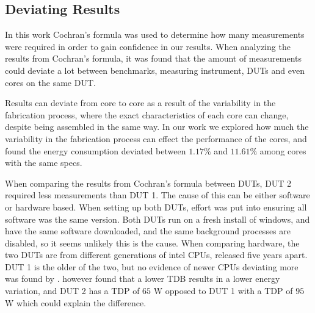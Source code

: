 \subsection{Deviating Results}

In this work Cochran's formula was used to determine how many measurements were required in order to gain confidence in our results. When analyzing the results from Cochran's formula, it was found that the amount of measurements could deviate a lot between benchmarks, measuring instrument, DUTs and even cores on the same DUT.

Results can deviate from core to core as a result of the variability in the fabrication process, where the exact characteristics of each core can change, despite being assembled in the same way.\cite{Mauzy2020} In our work we explored how much the variability in the fabrication process can effect the performance of the cores, and found the energy consumption deviated between $1.17\%$ and $11.61\%$ among cores with the same specs. %

When comparing the results from Cochran's formula between DUTs, DUT 2 required less measurements than DUT 1. The cause of this can be either software or hardware based. When setting up both DUTs, effort was put into ensuring all software was the same version. Both DUTs run on a fresh install of windows, and have the same software downloaded, and the same background processes are disabled, so it seems unlikely this is the cause. When comparing hardware, the two DUTs are from different generations of intel CPUs, released five years apart. DUT 1 is the older of the two, but no evidence of newer CPUs deviating more was found by \cite{Ournani2020}. \cite{Ournani2020} however found that a lower TDB results in a lower energy variation, and DUT 2 has a TDP of $65$ W opposed to DUT 1 with a TDP of $95$ W which could explain the difference\cite{IntelComparison}.





